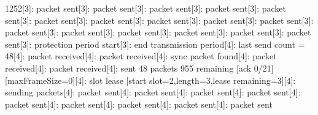 \documentclass[parskip]{cs4rep}
\begin{document}
1252[3]: packet sent[3]: packet sent[3]: packet sent[3]: packet sent[3]: packet sent[3]: packet sent[3]: packet sent[3]: packet sent[3]: packet sent[3]: packet sent[3]: packet sent[3]: packet sent[3]: packet sent[3]: packet sent[3]: packet sent[3]: packet sent[3]: protection period start[3]: end transmission period[4]: last send count = 48[4]: packet received[4]: packet received[4]: sync packet found[4]: packet received[4]: packet received[4]: sent 48 packets 955 remaining [ack 0/21] [maxFrameSize=0][4]: slot lease [start slot=2,length=3,lease remaining=3][4]: sending packets[4]: packet sent[4]: packet sent[4]: packet sent[4]: packet sent[4]: packet sent[4]: packet sent[4]: packet sent[4]: packet sent[4]: packet sent\newline
\end{document}
